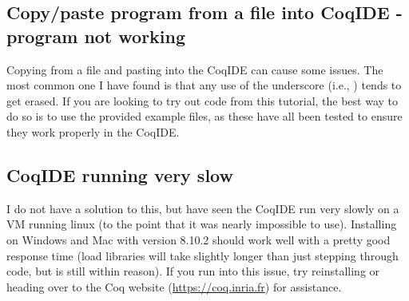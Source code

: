 \subsection{Copy/paste program from a file into CoqIDE - program not working}

Copying from a file and pasting into the CoqIDE can cause some issues. 
The most common one I have found is that any use of the underscore (i.e., \TT{\_}) tends to get erased. 
If you are looking to try out code from this tutorial, the best way to do so is to use the provided example files, 
as these have all been tested to ensure they work properly in the CoqIDE.  




\subsection{CoqIDE running very slow}

I do not have a solution to this, but have seen the CoqIDE run very slowly on a VM running linux 
(to the point that it was nearly impossible to use). 
Installing on Windows and Mac with version 8.10.2 should work well with a pretty good response time 
(load libraries will take slightly longer than just stepping through code, but is still within reason). 
If you run into this issue, try reinstalling or heading over to the Coq website (\url{https://coq.inria.fr}) 
for assistance.  





